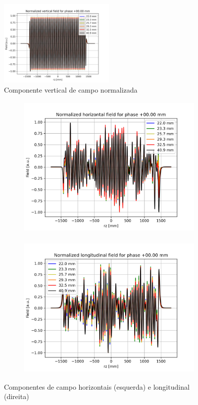 \documentclass[a4paper,12pt]{article}
\begin{document}
\begin{figure}[H]
\begin{center}
\includegraphics[width=0.5\textwidth]{figs/phase0 By.png}
\caption{Componente vertical de campo normalizada}
\label{fig:by0}
\end{center}
\end{figure}

\begin{figure}[H]
\begin{subfigure}{0.5\textwidth}
\includegraphics[width=0.9\linewidth, height=7cm]{figs/phase0 Bx.png} 
\label{fig:subim1}
\end{subfigure}
\begin{subfigure}{0.5\textwidth}
\includegraphics[width=0.9\linewidth, height=7cm]{figs/phase0 Bz.png}
\label{fig:subim2}
\end{subfigure}
\caption{Componentes de campo horizontais (esquerda) e longitudinal (direita)}
\label{fig:bx_bz0}
\end{figure}
\end{document}
